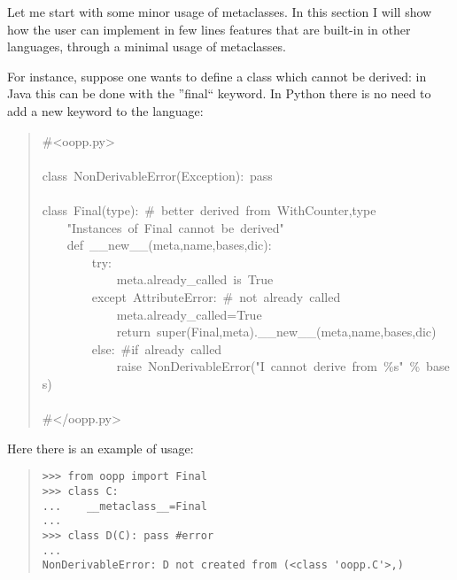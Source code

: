 \documentclass[10pt,english]{article}
\begin{document}
Let me start with some minor usage of metaclasses. In this section I
will show how the user can implement in few lines features that are
built-in in other languages, through a minimal usage of metaclasses.

For instance, suppose one wants to define a class which cannot be 
derived: in Java this can be done with the ''final`` keyword. 
In Python there is no need to add a new keyword to the language:
\begin{quote}
\begin{ttfamily}\begin{flushleft}
\mbox{{\#}<oopp.py>}\\
\mbox{}\\
\mbox{class~NonDerivableError(Exception):~pass}\\
\mbox{}\\
\mbox{class~Final(type):~{\#}~better~derived~from~WithCounter,type}\\
\mbox{~~~~"Instances~of~Final~cannot~be~derived"}\\
\mbox{~~~~def~{\_}{\_}new{\_}{\_}(meta,name,bases,dic):}\\
\mbox{~~~~~~~~try:}\\
\mbox{~~~~~~~~~~~~meta.already{\_}called~is~True}\\
\mbox{~~~~~~~~except~AttributeError:~{\#}~not~already~called}\\
\mbox{~~~~~~~~~~~~meta.already{\_}called=True}\\
\mbox{~~~~~~~~~~~~return~super(Final,meta).{\_}{\_}new{\_}{\_}(meta,name,bases,dic)}\\
\mbox{~~~~~~~~else:~{\#}if~already~called}\\
\mbox{~~~~~~~~~~~~raise~NonDerivableError("I~cannot~derive~from~{\%}s"~{\%}~bases)}\\
\mbox{}\\
\mbox{{\#}</oopp.py>}
\end{flushleft}\end{ttfamily}
\end{quote}

Here there is an example of usage:
\begin{quote}
\begin{verbatim}>>> from oopp import Final
>>> class C:
...    __metaclass__=Final
...
>>> class D(C): pass #error
...
NonDerivableError: D not created from (<class 'oopp.C'>,)\end{verbatim}
\end{quote}
\end{document}
